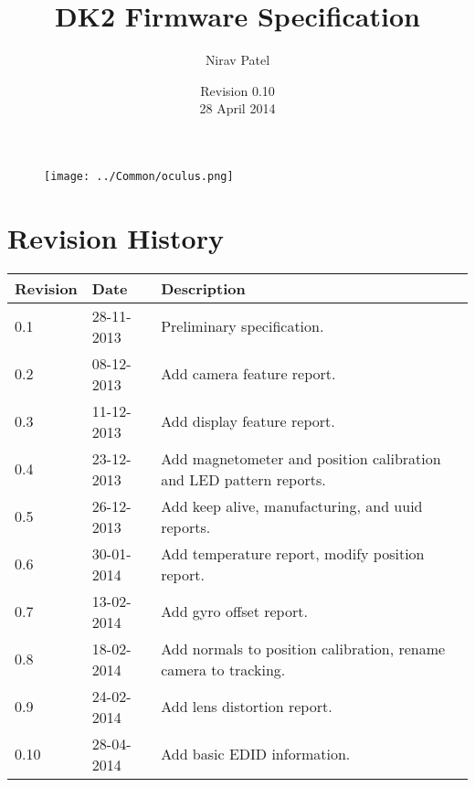 \documentclass[letterpaper]{article}
\begin{document}
\title{\huge DK2 Firmware Specification}
\author{Nirav Patel}
\date{Revision 0.10\\
28 April 2014}

\begin{figure}
\texttt{[image: ../Common/oculus.png]}
\end{figure}

\maketitle
\thispagestyle{empty}

\cfoot{}
\rfoot{\thepage}

\newpage

\tableofcontents

\newpage

\section{Revision History}

\begin{center}
    \begin{tabular}{ | l | l | p{8cm} |}
    \hline
    \cellcolor{lightgray} Revision & \cellcolor{lightgray} Date & \cellcolor{lightgray} Description \\ \hline
    0.1 & 28-11-2013 & Preliminary specification. \\ \hline
    0.2 & 08-12-2013 & Add camera feature report. \\ \hline
    0.3 & 11-12-2013 & Add display feature report. \\ \hline
    0.4 & 23-12-2013 & Add magnetometer and position calibration and LED pattern reports. \\ \hline
    0.5 & 26-12-2013 & Add keep alive, manufacturing, and uuid reports. \\ \hline
    0.6 & 30-01-2014 & Add temperature report, modify position report. \\ \hline
    0.7 & 13-02-2014 & Add gyro offset report. \\ \hline
    0.8 & 18-02-2014 & Add normals to position calibration, rename camera to tracking. \\ \hline
    0.9 & 24-02-2014 & Add lens distortion report. \\ \hline
    0.10 & 28-04-2014 & Add basic EDID information. \\ \hline
    \end{tabular}
\end{center}
\end{document}
